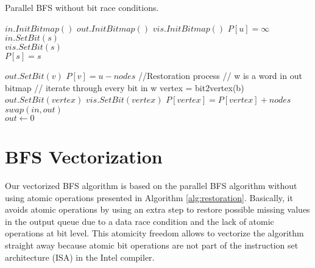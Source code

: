 \documentclass{sig-alternate-05-2015}
\begin{document}
\begin{algorithm}
\small
\caption{Parallel BFS without bit race conditions.}
\label{alg:restoration}
\begin{algorithmic}[1]

\renewcommand{\algorithmicrequire}{\textbf{Initialize:}}
\REQUIRE $in.InitBitmap()$
 $out.InitBitmap()$
 $vis.InitBitmap()$
\STATE 
$P[u] = \infty$ \\
\ENDFOR
\STATE
$in.SetBit(s)$ \\
\STATE
$vis.SetBit(s)$ \\
\STATE
$P[s] = s$

\STATE $out.SetBit(v)$
\STATE $P[v] = u - nodes$
\ENDIF
\ENDFOR
\STATE //Restoration process
\STATE // w is a word in out bitmap 
	\STATE // iterate through every bit in w
		\STATE vertex = bit2vertex(b) 
			\STATE $out.SetBit(vertex)$
			\STATE $vis.SetBit(vertex)$
			\STATE $P[vertex] = P[vertex] + nodes $
		\ENDIF
	\ENDFOR
\ENDIF
\ENDFOR
\ENDFOR
\STATE $swap(in, out)$\\
 $out \leftarrow 0$
\ENDWHILE
\end{algorithmic}
\end{algorithm}

\section{BFS Vectorization}
\label{sec:vectorization}


Our vectorized BFS algorithm is based on the parallel BFS algorithm without using atomic operations presented in Algorithm \ref{alg:restoration}. Basically, it avoids atomic operations by using an extra step to restore possible missing values in the output queue due to a data race condition and the lack of atomic operations at bit level. This atomicity freedom allows to vectorize the algorithm straight away because atomic bit operations are not part of the instruction set architecture (ISA) in the Intel compiler\cite{xeonInstSet}.
\end{document}
